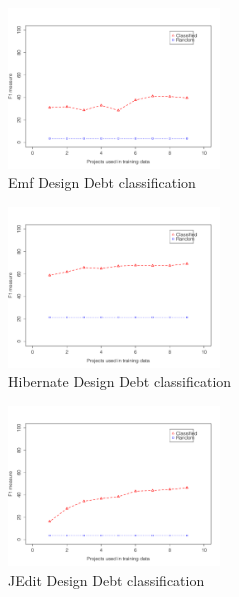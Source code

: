 \begin{figure}[thb!]
  \centering
  \includegraphics[width=0.50\textwidth]{figures/design_emf.pdf}
  \vspace{-3mm}
  \caption{Emf Design Debt classification}
  \label{fig:design_emf}
\end{figure}

\clearpage

\begin{figure}[thb!]
  \centering
  \includegraphics[width=0.50\textwidth]{figures/design_hibernate.pdf}
  \caption{Hibernate Design Debt classification}
  \label{fig:design_hibernate}
\end{figure}

\begin{figure}[thb!]
  \centering
  \includegraphics[width=0.50\textwidth]{figures/design_jedit.pdf}
  \vspace{-3mm}
  \caption{JEdit Design Debt classification}
  \label{fig:design_jedit}
\end{figure}

